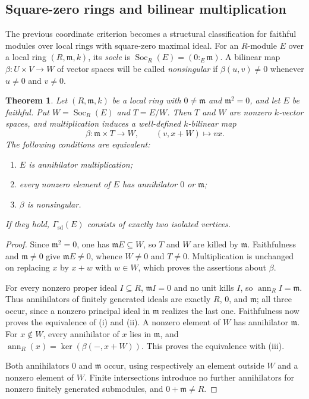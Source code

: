 \documentclass[11pt]{amsart}
\theoremstyle{plain}
\newtheorem{theorem}{Theorem}[section]
\theoremstyle{definition}
\theoremstyle{remark}
\DeclareMathOperator{\Soc}{Soc}
\newcommand{\ann}{\operatorname{ann}}
\newcommand{\GammaSD}{\Gamma_{\mathrm{sd}}}
\numberwithin{equation}{section}
\begin{document}
\subsection{Square-zero rings and bilinear multiplication}
\label{subsec:squarezero}

The previous coordinate criterion becomes a structural classification
for faithful modules over local rings with square-zero maximal ideal.
For an $R$-module $E$ over a local ring $(R,\mathfrak m,k)$, its
\emph{socle} is $\Soc_R(E)=(0:_E\mathfrak m)$.
A bilinear map $\beta:U\times V\to W$ of vector spaces will be called
\emph{nonsingular} if $\beta(u,v)\ne0$ whenever $u\ne0$ and $v\ne0$.

\begin{theorem}\label{thm:squarezero-bilinear}
Let $(R,\mathfrak m,k)$ be a local ring with
$0\ne\mathfrak m$ and $\mathfrak m^2=0$, and let $E$ be faithful.
Put $W=\Soc_R(E)$ and $T=E/W$.
Then $T$ and $W$ are nonzero $k$-vector spaces, and multiplication
induces a well-defined $k$-bilinear map
\[
 \beta:\mathfrak m\times T\longrightarrow W,
 \qquad (v,x+W)\longmapsto vx.
\]
The following conditions are equivalent:
\begin{enumerate}[label=\textup{(\roman*)}]
\item $E$ is annihilator multiplication;
\item every nonzero element of $E$ has annihilator $0$ or $\mathfrak m$;
\item $\beta$ is nonsingular.
\end{enumerate}
If they hold, $\GammaSD(E)$ consists of exactly two isolated vertices.
\end{theorem}

\begin{proof}
Since $\mathfrak m^2=0$, one has $\mathfrak m E\subseteq W$, so
$T$ and $W$ are killed by $\mathfrak m$.
Faithfulness and $\mathfrak m\ne0$ give $\mathfrak mE\ne0$,
whence $W\ne0$ and $T\ne0$.
Multiplication is unchanged on replacing $x$ by $x+w$ with $w\in W$,
which proves the assertions about $\beta$.

For every nonzero proper ideal $I\subseteq R$,
$\mathfrak m I=0$ and no unit kills $I$, so $\ann_R I=\mathfrak m$.
Thus annihilators of finitely generated ideals are exactly
$R$, $0$, and $\mathfrak m$; all three occur, since a nonzero
principal ideal in $\mathfrak m$ realizes the last one.
Faithfulness now proves the equivalence of (i) and (ii).
A nonzero element of $W$ has annihilator $\mathfrak m$.
For $x\notin W$, every annihilator of $x$ lies in $\mathfrak m$,
and
$\ann_R(x)=\ker(\beta(-,x+W))$.
This proves the equivalence with (iii).

Both annihilators $0$ and $\mathfrak m$ occur, using respectively an
element outside $W$ and a nonzero element of $W$.
Finite intersections introduce no further annihilators for nonzero
finitely generated submodules, and $0+\mathfrak m\ne R$.
\end{proof}
\end{document}
